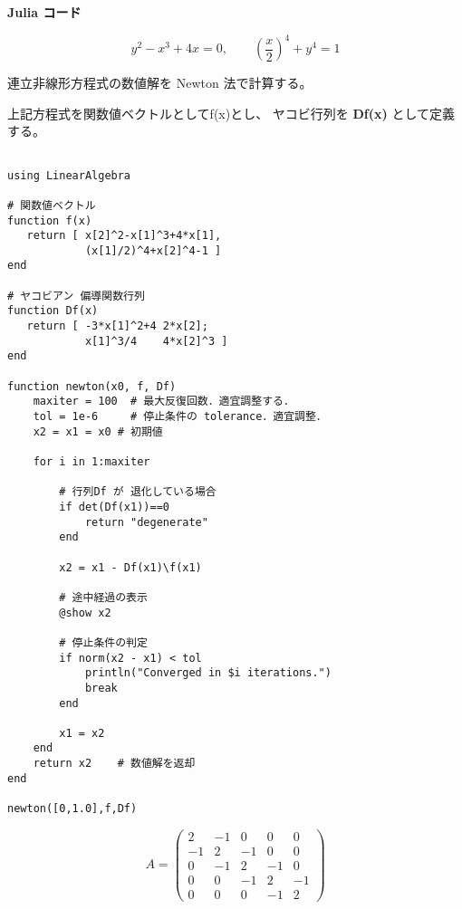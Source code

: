 \documentclass[12pt,b5paper]{ltjsarticle}
\begin{document}
\textbf{Julia コード}

\hrulefill

\begin{equation}
 y^{2} - x^{3} + 4x =0
  ,\qquad
  \left( \frac{x}{2} \right)^{4} + y^{4} =1
\end{equation}

連立非線形方程式の数値解を Newton 法で計算する。

上記方程式を関数値ベクトルとして\textrm{f(x)}とし、
ヤコビ行列を \textbf{Df(x)} として定義する。

\begin{lstlisting}

using LinearAlgebra

# 関数値ベクトル
function f(x)
   return [ x[2]^2-x[1]^3+4*x[1],
            (x[1]/2)^4+x[2]^4-1 ]
end

# ヤコビアン 偏導関数行列
function Df(x)
   return [ -3*x[1]^2+4 2*x[2];
            x[1]^3/4    4*x[2]^3 ]
end

function newton(x0, f, Df)
    maxiter = 100  # 最大反復回数．適宜調整する．
    tol = 1e-6     # 停止条件の tolerance．適宜調整．
    x2 = x1 = x0 # 初期値

    for i in 1:maxiter

        # 行列Df が 退化している場合
        if det(Df(x1))==0
            return "degenerate"
        end

        x2 = x1 - Df(x1)\f(x1)

        # 途中経過の表示
        @show x2

        # 停止条件の判定
        if norm(x2 - x1) < tol
            println("Converged in $i iterations.")
            break
        end

        x1 = x2
    end
    return x2    # 数値解を返却
end

newton([0,1.0],f,Df)

\end{lstlisting}

\hrulefill


\begin{equation}
 A=
  \begin{pmatrix}
   2 & -1 & 0 & 0 & 0 \\
   -1 & 2 & -1 & 0 & 0 \\
   0 & -1 & 2 & -1 & 0 \\
   0 & 0 & -1 & 2 & -1 \\
   0 & 0 & 0 & -1 & 2
  \end{pmatrix}
\end{equation}
\end{document}
